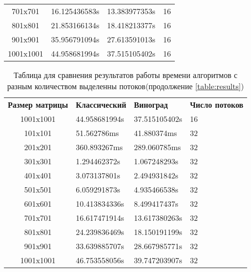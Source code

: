 \begin{table}[]
\begin{tabular}{clll}
701x701                                     & 16.125436583s         & 13.383977353s     & 16                     \\
801x801                                     & 21.853166134s         & 18.418213377s     & 16                     \\
901x901                                     & 35.956791094s         & 27.613591013s     & 16                     \\
1001x1001                                   & 44.958681994s         & 37.515105402s     & 16                     \\
\end{tabular}
\end{table}

\begin{table}[]
\caption{Таблица для сравнения результатов работы времени алгоритмов с разным количеством выделенны потоков(продолжение \ref{table:results})}
\label{table:results2}
\begin{tabular}{clll}
\multicolumn{1}{l}{\textbf{Размер матрицы}} & \textbf{Классический} & \textbf{Виноград} & \textbf{Число потоков} \\
1001x1001                                   & 44.958681994s         & 37.515105402s     & 16                     \\
101x101                                     & 51.562786ms           & 41.880374ms       & 32                     \\
201x201                                     & 360.893267ms          & 289.060785ms      & 32                     \\
301x301                                     & 1.294462372s          & 1.067248293s      & 32                     \\
401x401                                     & 3.073137801s          & 2.494931842s      & 32                     \\
501x501                                     & 6.059291873s          & 4.935466538s      & 32                     \\
601x601                                     & 10.413834336s         & 8.499417437s      & 32                     \\
701x701                                     & 16.617471914s         & 13.617380263s     & 32                     \\
801x801                                     & 24.239836469s         & 18.150191199s     & 32                     \\
901x901                                     & 33.639885707s         & 28.667985771s     & 32                     \\
1001x1001                                   & 46.753558056s         & 39.747203907s     & 32                    
\end{tabular}
\end{table}
